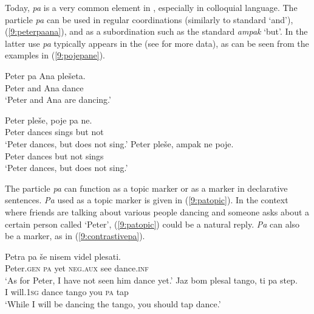 \documentclass[output=paper,modfonts,newtxmath,hidelinks]{langscibook}
\begin{document}
Today, \textit{pa} is a very common element in , especially in colloquial language. The particle \textit{pa} can be used in regular coordinations (similarly to standard  `and'), (\ref{9:peterpaana}), and as a subordination  such as the standard  \textit{ampak} `but'. In the latter use \textit{pa} typically appears in the  (see \citealt{marusicetal2011pa} for more data), as can be seen from the examples in (\ref{9:pojepane}).

\begin{exe}
\ex \label{9:peterpaana}
\gll Peter 	pa Ana plešeta. \\
	Peter 	and Ana dance\\
\trans  `Peter and Ana are dancing.' 
\ex \label{9:pojepane}
\begin{xlist}
\ex \gll	Peter pleše, poje pa ne. \\
 		Peter 	dances sings but not\\
\trans `Peter dances, but does not sing.'
\ex \gll 	Peter pleše, ampak ne poje. \\
 	Peter 	dances but not sings\\
 \trans `Peter dances, but does not sing.'
\end{xlist}
\end{exe}

\noindent The particle \textit{pa} can function as a topic marker or as a  marker in declarative sentences. \textit{Pa} used as a topic marker is given in (\ref{9:patopic}). In the context where friends are talking about various people dancing and someone asks about a certain person called `Peter', (\ref{9:patopic}) could be a natural reply. \textit{Pa} can also be a  marker, as in (\ref{9:contrastivepa}). 

\begin{exe}
\ex \label{9:patopic}
\gll  Petra 	pa še nisem videl plesati.\\
 	Peter.\textsc{gen} 	\textsc{pa} yet \textsc{neg.aux} see dance.\textsc{inf} \\
\trans   `As for Peter, I have not seen him dance yet.' 
\ex \label{9:contrastivepa}
\gll Jaz bom plesal tango, ti pa step.\\
 	I will.\textsc{1sg} dance tango you \textsc{pa} tap\\
\trans   `While I will be dancing the tango, you should tap dance.' 
\end{exe}
\end{document}
